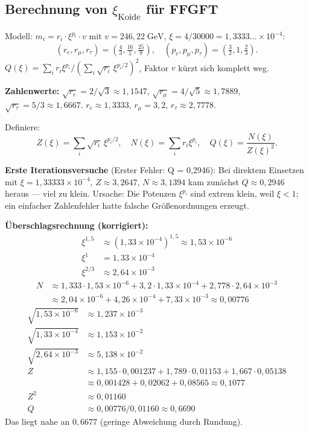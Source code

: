 \subsection{Berechnung von $\xi_{\text{Koide}}$ für FFGFT}

Modell: $m_i=r_i\cdot\xi^{p_i}\cdot v$ mit $v=246{,}22\;\text{GeV}$,
$\xi=4/30000=1{,}3333\ldots\times10^{-4}$:
\[
  (r_e,r_\mu,r_\tau)=\left(\tfrac{4}{3},\tfrac{16}{5},\tfrac{25}{9}\right),
  \quad (p_e,p_\mu,p_\tau)=\left(\tfrac{3}{2},1,\tfrac{2}{3}\right).
\]
$Q(\xi)=\sum_ir_i\xi^{p_i}/(\sum_i\sqrt{r_i}\,\xi^{p_i/2})^2$,
Faktor $v$ kürzt sich komplett weg.

\textbf{Zahlenwerte:}
$\sqrt{r_e}=2/\sqrt{3}\approx1{,}1547$, $\sqrt{r_\mu}=4/\sqrt{5}\approx1{,}7889$,
$\sqrt{r_\tau}=5/3\approx1{,}6667$.
$r_e\approx1{,}3333$, $r_\mu=3{,}2$, $r_\tau\approx2{,}7778$.

Definiere:
\[
  Z(\xi)=\sum_i\sqrt{r_i}\,\xi^{p_i/2}, \quad
  N(\xi)=\sum_ir_i\xi^{p_i}, \quad
  Q(\xi)=\frac{N(\xi)}{Z(\xi)^2}.
\]

\textbf{Erste Iterationsversuche} (Erster Fehler: Q = 0{,}2946):
Bei direktem Einsetzen mit $\xi=1{,}33333\times10^{-4}$, $Z\approx3{,}2647$,
$N\approx3{,}1394$ kam zunächst $Q\approx0{,}2946$ heraus — viel zu klein.
Ursache: Die Potenzen $\xi^{p_i}$ sind extrem klein, weil $\xi<1$;
ein einfacher Zahlenfehler hatte falsche Größenordnungen erzeugt.

\textbf{Überschlagsrechnung (korrigiert):}
\begin{align*}
  \xi^{1{,}5} &\approx (1{,}33\times10^{-4})^{1{,}5}
    \approx 1{,}53\times10^{-6} \\
  \xi^1 &= 1{,}33\times10^{-4} \\
  \xi^{2/3} &\approx 2{,}64\times10^{-3}
\end{align*}
\begin{align*}
  N &\approx 1{,}333\cdot1{,}53\times10^{-6}+3{,}2\cdot1{,}33\times10^{-4}
    +2{,}778\cdot2{,}64\times10^{-3} \\
    &\approx 2{,}04\times10^{-6}+4{,}26\times10^{-4}+7{,}33\times10^{-3}
    \approx 0{,}00776
\end{align*}
\begin{align*}
  \sqrt{1{,}53\times10^{-6}} &\approx 1{,}237\times10^{-3} \\
  \sqrt{1{,}33\times10^{-4}} &\approx 1{,}153\times10^{-2} \\
  \sqrt{2{,}64\times10^{-3}} &\approx 5{,}138\times10^{-2} \\
  Z &\approx 1{,}155\cdot0{,}001237+1{,}789\cdot0{,}01153+1{,}667\cdot0{,}05138 \\
    &\approx 0{,}001428+0{,}02062+0{,}08565\approx0{,}1077 \\
  Z^2 &\approx 0{,}01160 \\
  Q &\approx 0{,}00776/0{,}01160\approx0{,}6690
\end{align*}
Das liegt nahe an $0{,}6677$ (geringe Abweichung durch Rundung).

